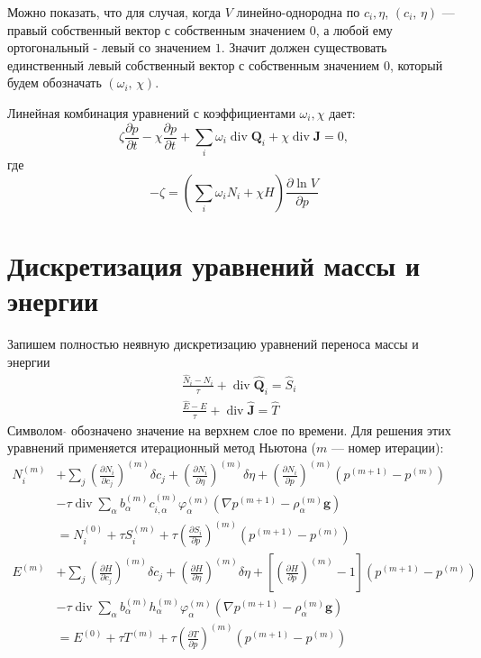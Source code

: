 \documentclass[12pt]{article}
\newcommand{\pd}[2]{\frac{\partial #1}{\partial #2}}
\renewcommand{\div}{\operatorname{div}}
\begin{document}
Можно показать, что для случая, когда $V$ линейно-однородна по $c_i, \eta$, $(c_i,\,
\eta)$ --- правый собственный вектор с собственным
значением $0$, а любой ему ортогональный - левый со значением $1$. Значит должен
существовать единственный левый собственный вектор с собственным значением $0$,
который будем обозначать $(\omega_i,\, \chi)$.

Линейная комбинация уравнений с коэффициентами $\omega_i, \chi$ дает:
\[
\zeta\pd{p}{t} - \chi\pd{p}{t}
+ \sum_i \omega_i \div \mathbf{Q}_i + \chi \div \mathbf{J} = 0,
\]
где 
\[-\zeta = \left(\sum_i \omega_i N_i + \chi H\right) \pd{\ln V}{p}\]

\section{Дискретизация уравнений массы и энергии}
Запишем полностью неявную дискретизацию уравнений переноса массы и энергии
\begin{align}
&\frac{\hat N_i - N_i}{\tau} + \div {\hat{\mathbf{Q}}_i} = \hat S_i\\
&\frac{\hat E - E}{\tau} + \div {\hat{\mathbf{J}}} = \hat T
\end{align}
Символом $\hat{}$ обозначено значение на верхнем слое по времени. Для решения этих
уравнений применяется итерационный метод Ньютона ($m$ --- номер итерации):
\begin{align*}
N_i^{(m)} &+ \sum_j \left(\pd{N_i}{c_j}\right)^{(m)}\delta c_j + 
\left(\pd{N_i}{\eta}\right)^{(m)} \delta \eta 
+\left(\pd{N_i}{p}\right)^{(m)} (p^{(m+1)} - p^{(m)})\\
&-\tau\div \sum_\alpha 
b_\alpha^{(m)}
c_{i,\alpha}^{(m)}
\varphi_\alpha^{(m)}
\left(\nabla p^{(m+1)} - \rho^{(m)}_\alpha \mathbf{g}\right)\\
&= N_i^{(0)} + \tau S_i^{(m)}
+ \tau \left(\pd{S_i}{p}\right)^{(m)}(p^{(m+1)} - p^{(m)})\\
%
E^{(m)} &+ \sum_j \left(\pd{H}{c_j}\right)^{(m)}\delta c_j + 
\left(\pd{H}{\eta}\right)^{(m)} \delta \eta 
+\left[\left(\pd{H}{p}\right)^{(m)} - 1\right]
(p^{(m+1)} - p^{(m)})\\
&-\tau\div \sum_\alpha 
b_\alpha^{(m)} 
h_{\alpha}^{(m)} 
\varphi_\alpha^{(m)}
\left(\nabla p^{(m+1)} - \rho^{(m)}_\alpha \mathbf{g}\right)\\
&= E^{(0)} + \tau T^{(m)}
+ \tau \left(\pd{T}{p}\right)^{(m)}(p^{(m+1)} - p^{(m)})
\end{align*}
\end{document}
